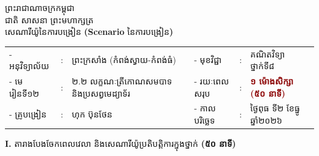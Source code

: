 \documentclass[a4paper,10pt]{article}
\newcommand{\enbf}[1]{{\TimesEn\textbf{#1}}}
\begin{document}
\fontsize{9.8pt}{14.6pt}\selectfont

\begin{center}
  {\muol\fontsize{11pt}{16pt}\selectfont ព្រះរាជាណាចក្រកម្ពុជា}\\[1pt]
  {\muol\fontsize{10pt}{15pt}\selectfont ជាតិ សាសនា ព្រះមហាក្សត្រ}\\[4pt]
  {\muol\fontsize{10.5pt}{15pt}\selectfont សេណារីយ៉ូនៃការបង្រៀន \enbf{(Scenario} នៃការបង្រៀន\enbf{)}}
\end{center}

\vspace{2pt}
{\renewcommand{\arraystretch}{1.10}
\begin{tabular}{@{}l l l p{0.4cm} l l l@{}}
  - អនុវិទ្យាល័យ & : & ព្រះក្រសាំង (កំពង់ស្វាយ-កំពង់ធំ) & & - មុខវិជ្ជា & : & គណិតវិទ្យា ថ្នាក់ទី៨ \\
  - មេរៀនទី១២ & : & ២.២ លក្ខណៈត្រីកោណសមបាទ និងប្រសព្វមេដ្យាទ័រ & & - រយៈពេលសរុប & : & \textcolor{darkred}{\textbf{១ ម៉ោងសិក្សា (៥០ នាទី)}} \\
  - គ្រូបង្រៀន & : & ហុក ប៊ុនថែន & & - កាលបរិច្ឆេទ & : & ថ្ងៃពុធ ទី២ ខែធ្នូ ឆ្នាំ២០២៦ \\
\end{tabular}
}

\vspace{2pt}

\textbf{I.} {\muol តារាងបែងចែកពេលវេលា និងសេណារីយ៉ូប្រតិបត្តិការក្នុងថ្នាក់} \textbf{(៥០ នាទី)}
\end{document}
